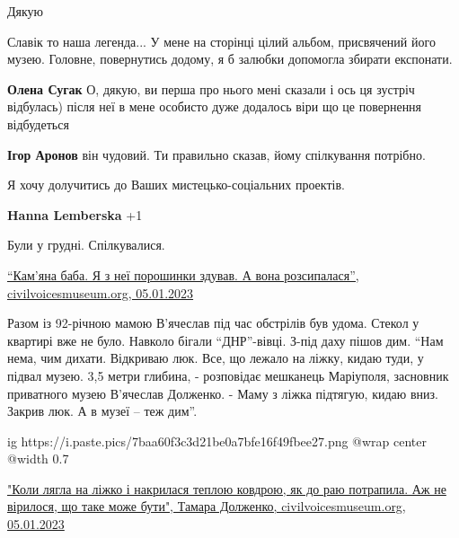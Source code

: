 
Дякую


Славік то наша легенда... У мене на сторінці цілий альбом, присвячений його
музею. Головне, повернутись додому, я б залюбки допомогла збирати експонати.

\begin{itemize} %
\textbf{Олена Сугак} О, дякую, ви перша про нього мені сказали і ось ця зустріч відбулась) після неї в мене особисто дуже додалось віри що це повернення відбудеться

\textbf{Ігор Аронов} він чудовий. Ти правильно сказав, йому спілкування потрібно.
\end{itemize} %


Я хочу долучитись до Ваших мистецько-соціальних проектів.

\begin{itemize} %
\textbf{Hanna Lemberska} +1
\end{itemize} %


Були у грудні. Спілкувалися. 

\href{https://civilvoicesmuseum.org/stories/kamennaya-baba-ya-s-nee-pylinki-sduval-a-ona-rassypalas}{%
\enquote{Кам'яна баба. Я з неї порошинки здував. А вона розсипалася}, %
civilvoicesmuseum.org, 05.01.2023%
}

Разом із 92-річною мамою В'ячеслав під час обстрілів був удома. Стекол у
квартирі вже не було. Навколо бігали \enquote{ДНР}-вівці. З-під даху пішов дим. \enquote{Нам
нема, чим дихати. Відкриваю люк. Все, що лежало на ліжку, кидаю туди, у підвал
музею. 3,5 метри глибина, - розповідає мешканець Маріуполя, засновник
приватного музею В'ячеслав Долженко. - Маму з ліжка підтягую, кидаю вниз.
Закрив люк. А в музеї – теж дим}.

\ifcmt
  ig https://i.paste.pics/7baa60f3c3d21be0a7bfe16f49fbee27.png
  @wrap center
  @width 0.7
\fi


\href{https://civilvoicesmuseum.org/stories/kogda-legla-na-krovat-i-nakrylas-teplym-odeyalom-kak-v-raj-popala-azh-ne-verilos-chto-takoe-mozhet-byt}{%
"Коли лягла на ліжко і накрилася теплою ковдрою, як до раю потрапила. Аж не вірилося, що таке може бути", %
Тамара Долженко, civilvoicesmuseum.org, 05.01.2023%
}

